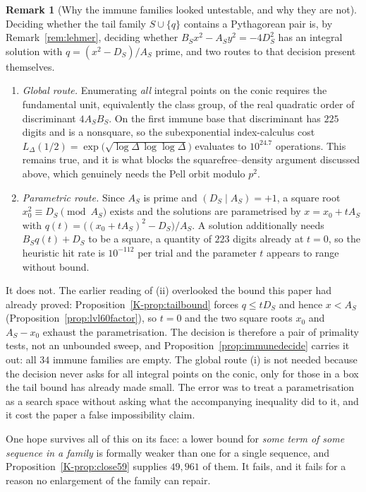 \documentclass[11pt]{article}
\theoremstyle{definition}
\newtheorem{remark}[theorem]{Remark}
\begin{document}
\begin{remark}[Why the immune families looked untestable, and why they are not]\label{rem:untestable}
Deciding whether the tail family $S\cup\{q\}$ contains a Pythagorean pair is, by
Remark~\textup{\ref{rem:lehmer}}, deciding whether $B_Sx^2-A_Sy^2=-4D_S^2$ has an integral solution
with $q=(x^2-D_S)/A_S$ prime, and two routes to that decision present themselves.
\begin{enumerate}[label=\textup{(\roman*)},leftmargin=2.2em]
\item \emph{Global route.} Enumerating \emph{all} integral points on the conic requires the
fundamental unit, equivalently the class group, of the real quadratic order of discriminant
$4A_SB_S$. On the first immune base that discriminant has $225$ digits and is a nonsquare, so the
subexponential index-calculus cost
$L_\Delta(1/2)=\exp\bigl(\sqrt{\log\Delta\,\log\log\Delta}\bigr)$ evaluates to $10^{24.7}$
operations. This remains true, and it is what blocks the squarefree--density argument discussed
above, which genuinely needs the Pell orbit modulo $p^2$.
\item \emph{Parametric route.} Since $A_S$ is prime and $(D_S\mid A_S)=+1$, a square root
$x_0^2\equiv D_S\pmod{A_S}$ exists and the solutions are parametrised by $x=x_0+tA_S$ with
$q(t)=\bigl((x_0+tA_S)^2-D_S\bigr)/A_S$. A solution additionally needs $B_Sq(t)+D_S$ to be a square,
a quantity of $223$ digits already at $t=0$, so the heuristic hit rate is $10^{-112}$ per trial and
the parameter $t$ appears to range without bound.
\end{enumerate}
It does not. The earlier reading of (ii) overlooked the bound this paper had already proved:
Proposition~\ref{K-prop:tailbound} forces $q\le tD_S$ and hence $x<A_S$
(Proposition~\ref{prop:lvl60factor}), so $t=0$ and the two square roots $x_0$ and $A_S-x_0$ exhaust
the parametrisation. The decision is therefore a pair of primality tests, not an unbounded sweep,
and Proposition~\ref{prop:immunedecide} carries it out: all $34$ immune families are empty. The
global route (i) is not needed because the decision never asks for all integral points on the conic,
only for those in a box the tail bound has already made small. The error was to treat a
parametrisation as a search space without asking what the accompanying inequality did to it, and it
cost the paper a false impossibility claim.
\end{remark}

One hope survives all of this on its face: a lower bound for \emph{some term of some sequence in a
family} is formally weaker than one for a single sequence, and Proposition~\ref{K-prop:close59}
supplies $49{,}961$ of them. It fails, and it fails for a reason no enlargement of the family can
repair.
\end{document}
